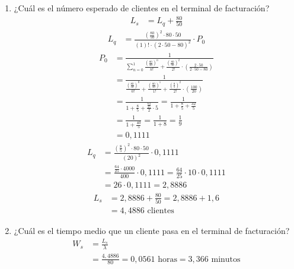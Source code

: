 \documentclass{templateNote}
\begin{document}
\begin{enumerate}
    \item ¿Cu\'al es el n\'umero esperado de clientes en el terminal de facturaci\'on?
    \begin{align*}
        L_s &= L_q + \frac{80}{50}
    \end{align*}
    \begin{align*}
        L_q &= \frac{\left(\frac{80}{50}\right)^2 \cdot 80 \cdot 50}{(1)! \cdot (2 \cdot 50 - 80)^2} \cdot P_0
    \end{align*}
    \begin{align*}
        P_0 &= \frac{1}{\displaystyle\sum_{n=0}^{1}{\frac{\left(\frac{80}{50}\right)^n}{n!} + \frac{\left(\frac{80}{50}\right)^2}{2!} \cdot \left(\frac{2 \cdot 50}{2 \cdot 50 - 80}\right)}} \\
        &= \frac{1}{\displaystyle\frac{\left(\frac{80}{50}\right)^0}{0!} + \frac{\left(\frac{80}{50}\right)^1}{1!} + \frac{\left(\frac{8}{5}\right)^2}{2!} \cdot \left(\frac{100}{20}\right)} \\
        &= \frac{1}{1 + \frac{8}{5} + \displaystyle\frac{\frac{64}{25}}{2} \cdot 5} = \frac{1}{1 + \frac{8}{5} + \frac{32}{5}} \\
        &= \frac{1}{1 + \frac{40}{5}} = \frac{1}{1 + 8} = \frac{1}{9} \\
        &= 0,1111
    \end{align*}
    \begin{align*}
        L_q &= \frac{\left(\frac{8}{5}\right)^2 \cdot 80 \cdot 50}{(20)^2} \cdot 0,1111 \\
        &= \frac{\frac{64}{25} \cdot 4000}{400} \cdot 0,1111 = \frac{64}{25} \cdot 10 \cdot 0,1111 \\
        &= 26 \cdot 0,1111 = 2,8886
    \end{align*}
    \begin{align*}
        L_s &= 2,8886 + \frac{80}{50} = 2,8886 + 1,6 \\
        &= 4,4886 \text{ clientes}
    \end{align*}

    \newpage
    \item ¿Cu\'al es el tiempo medio que un cliente pasa en el terminal de facturaci\'on?
    \begin{align*}
        W_s &= \frac{L_s}{\lambda} \\
        &= \frac{4,4886}{80} = 0,0561 \text{ horas} = 3,366 \text{ minutos}
    \end{align*}


\end{enumerate}
\end{document}

